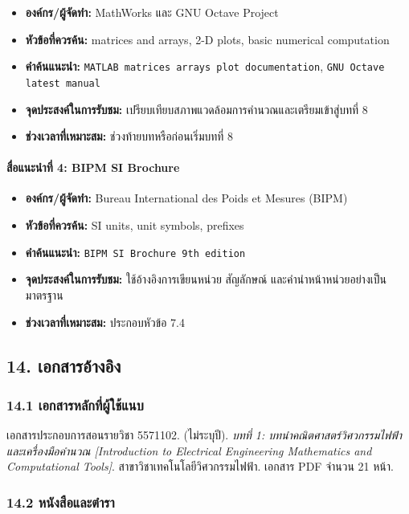 \begin{itemize}
    \item \textbf{องค์กร/ผู้จัดทำ:} MathWorks และ GNU Octave Project
    \item \textbf{หัวข้อที่ควรค้น:} matrices and arrays, 2-D plots, basic numerical computation
    \item \textbf{คำค้นแนะนำ:} \texttt{MATLAB matrices arrays plot documentation}, \texttt{GNU Octave latest manual}
    \item \textbf{จุดประสงค์ในการรับชม:} เปรียบเทียบสภาพแวดล้อมการคำนวณและเตรียมเข้าสู่บทที่ 8
    \item \textbf{ช่วงเวลาที่เหมาะสม:} ช่วงท้ายบทหรือก่อนเริ่มบทที่ 8
\end{itemize}

\paragraph{สื่อแนะนำที่ 4: BIPM SI Brochure}

\begin{itemize}
    \item \textbf{องค์กร/ผู้จัดทำ:} Bureau International des Poids et Mesures (BIPM)
    \item \textbf{หัวข้อที่ควรค้น:} SI units, unit symbols, prefixes
    \item \textbf{คำค้นแนะนำ:} \texttt{BIPM SI Brochure 9th edition}
    \item \textbf{จุดประสงค์ในการรับชม:} ใช้อ้างอิงการเขียนหน่วย สัญลักษณ์ และคำนำหน้าหน่วยอย่างเป็นมาตรฐาน
    \item \textbf{ช่วงเวลาที่เหมาะสม:} ประกอบหัวข้อ 7.4
\end{itemize}

 

\subsection{14. เอกสารอ้างอิง}

\subsubsection{14.1 เอกสารหลักที่ผู้ใช้แนบ}

เอกสารประกอบการสอนรายวิชา 5571102. (ไม่ระบุปี). \textit{บทที่ 1: บทนำคณิตศาสตร์วิศวกรรมไฟฟ้าและเครื่องมือคำนวณ [Introduction to Electrical Engineering Mathematics and Computational Tools]}. สาขาวิชาเทคโนโลยีวิศวกรรมไฟฟ้า. เอกสาร PDF จำนวน 21 หน้า.

\subsubsection{14.2 หนังสือและตำรา}

